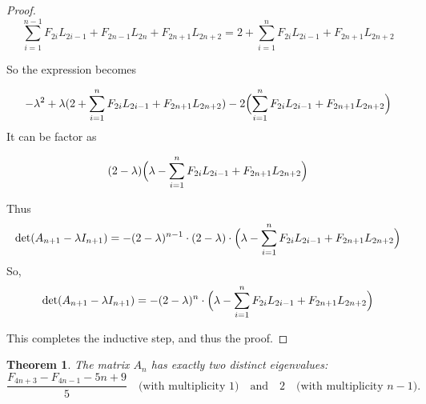 \documentclass[11pt]{birkjour}
\newtheorem{thm}{Theorem}[section]
\theoremstyle{definition}
\theoremstyle{remark}
\numberwithin{equation}{section}
\begin{document}
\begin{proof}
\[\sum_{i=1}^{n-1}F_{2i}L_{2i-1}+F_{2n-1}L_{2n}+F_{2n+1}L_{2n+2}=2+\sum_{i=1}^{n}F_{2i}L_{2i-1}+F_{2n+1}L_{2n+2}\]

\noindent So the expression becomes

\[-\lambda^2+\lambda(2+\sum_{i=1}^{n}F_{2i}L_{2i-1}+F_{2n+1}L_{2n+2})\\
-2\Bigl( \sum_{i=1}^{n}F_{2i}L_{2i-1}+F_{2n+1}L_{2n+2}\Bigr)\]
\noindent It can be factor as

\[(2-\lambda)\Bigl( \lambda - \sum_{i=1}^{n} F_{2i}L_{2i-1}+F_{2n+1}L_{2n+2} \Bigr)\]

\noindent Thus 
\[\operatorname{det}(A_{n+1}-\lambda I_{n+1})=-(2-\lambda)^{n-1}\cdot(2-\lambda)\cdot\Bigl( \lambda - \sum_{i=1}^{n} F_{2i}L_{2i-1}+F_{2n+1}L_{2n+2} \Bigr)\]
So, 
\[\operatorname{det}(A_{n+1}-\lambda I_{n+1})=-(2-\lambda)^{n}\cdot\Bigl( \lambda - \sum_{i=1}^{n} F_{2i}L_{2i-1}+F_{2n+1}L_{2n+2} \Bigr)\]

\noindent This completes the inductive step, and thus the proof.
\end{proof}

\begin{thm}\label{eigen}
The matrix $A_n$ has exactly two distinct eigenvalues:
\[
\frac{F_{4n + 3} - F_{4n - 1} - 5n + 9}{5} \quad \text{(with multiplicity 1)} \quad \text{and} \quad
2 \quad \text{(with multiplicity } n - 1\text{)}.
\]
\end{thm}
\end{document}

